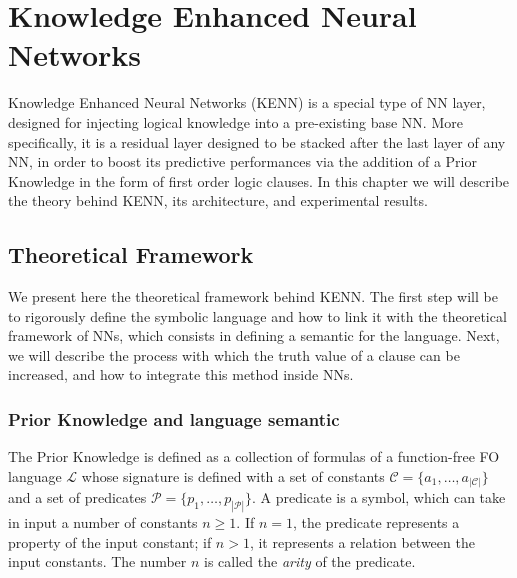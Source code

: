 
\chapter{Knowledge Enhanced Neural Networks}\label{chapt:kenn}
Knowledge Enhanced Neural Networks (KENN) \cite{daniele2019kenn} is a special type of NN layer, designed for injecting logical knowledge into a pre-existing base NN. More specifically, it is a residual layer designed to be stacked after the last layer of any NN, in order to boost its predictive performances via the addition of a Prior Knowledge in the form of first order logic clauses. In this chapter we will describe the theory behind KENN, its architecture, and experimental results.

\section{Theoretical Framework}\label{sec:kenn_theoretical_framework}
 We present here the theoretical framework behind KENN. The first step will be to rigorously define the symbolic language and how to link it with the theoretical framework of NNs, which consists in defining a semantic for the language. Next, we will describe the process with which the truth value of a clause can be increased, and how to integrate this method inside NNs.
 
 \subsection{Prior Knowledge and language semantic}

\begin{definition}
	
	The Prior Knowledge is defined as a collection of formulas of a function-free FO language $\mathcal{L}$ whose signature is defined with a set of constants $\mathcal{C} = \{a_1, \dots, a_{|\mathcal{C}|}\}$ and a set of predicates $\mathcal{P} = \{p_1, \dots, p_{|\mathcal{P}|}\}$. 
	A predicate is a symbol, which can take in input a number of constants $n \geq 1$. If $n=1$, the predicate represents a property of the input constant; if $n>1$, it represents a relation between the input constants. The number $n$ is called the \textit{arity} of the predicate.
\end{definition}

